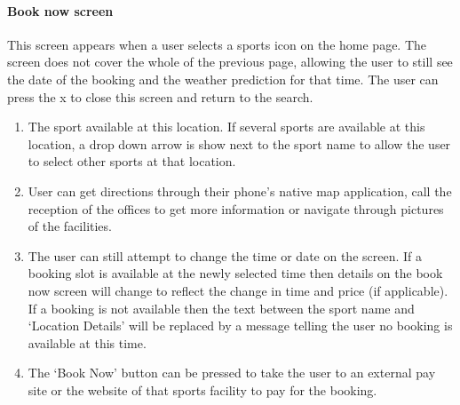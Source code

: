 \paragraph{Book now screen}
This screen appears when a user selects a sports icon on the home page. The
screen does not cover the whole of the previous page, allowing the user to
still see the date of the booking and the weather prediction for that time. The
user can press the x to close this screen and return to the search.

\begin{enumerate}
	\item The sport available at this location. If several sports are available
		at this location, a drop down arrow is show next to the sport name to
		allow the user to select other sports at that location.
	\item User can get directions through their phone's native map application,
		call the reception of the offices to get more information or navigate
		through pictures of the facilities.
	\item The user can still attempt to change the time or date on the screen.
		If a booking slot is available at the newly selected time then details
		on the book now screen will change to reflect the change in time and
		price (if applicable). If a booking is not available then the text
		between the sport name and `Location Details' will be replaced by a
		message telling the user no booking is available at this time.
	\item The `Book Now' button can be pressed to take the user to an external
		pay site or the website of that sports facility to pay for the booking.
\end{enumerate}

\fullwidth%

